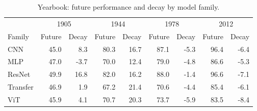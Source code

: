 \begin{table}[H]
\centering
\footnotesize
\caption{Yearbook: future performance and decay by model family.}
\label{tab:yearbook_by_family}
\begin{tabular}{l rrrrrrrr}
\toprule
 & \multicolumn{2}{c}{1905} & \multicolumn{2}{c}{1944} & \multicolumn{2}{c}{1978} & \multicolumn{2}{c}{2012} \\
Family & Future & Decay & Future & Decay & Future & Decay & Future & Decay \\
\midrule
CNN & 45.0 & 8.3 & 80.3 & 16.7 & 87.1 & -5.3 & 96.4 & -6.4 \\
MLP & 47.0 & -3.7 & 70.0 & 12.4 & 79.0 & -4.8 & 86.6 & -5.3 \\
ResNet & 49.9 & 16.8 & 82.0 & 16.2 & 88.0 & -1.4 & 96.6 & -7.1 \\
Transfer & 46.9 & 1.9 & 67.2 & 21.4 & 70.6 & -4.4 & 85.4 & -6.1 \\
ViT & 45.9 & 4.1 & 70.7 & 20.3 & 73.7 & -5.9 & 83.5 & -8.4 \\
\bottomrule
\end{tabular}
\end{table}
